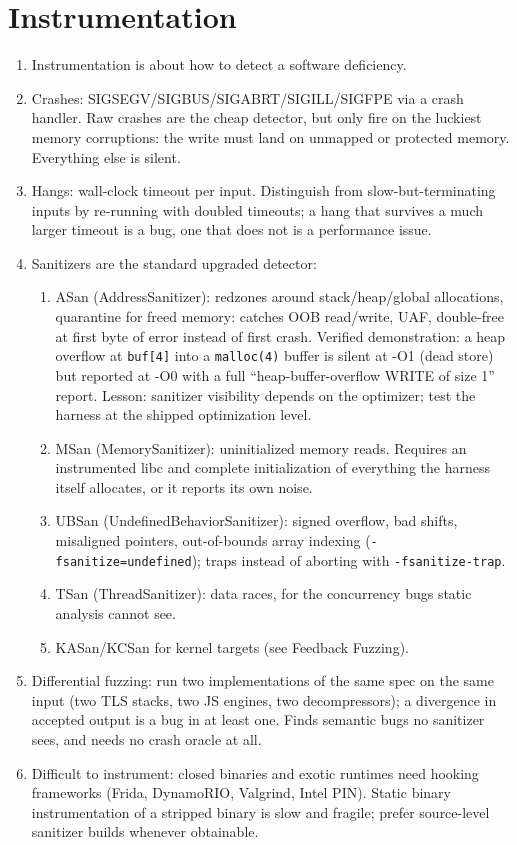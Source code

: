 \documentclass[12pt]{Training}
\begin{document}
\section*{Instrumentation}
\begin{enumerate}
	\item Instrumentation is about how to detect a software deficiency.
	\item Crashes: SIGSEGV/SIGBUS/SIGABRT/SIGILL/SIGFPE via a crash handler. Raw crashes are the cheap detector, but only fire on the luckiest memory corruptions: the write must land on unmapped or protected memory. Everything else is silent.
	\item Hangs: wall-clock timeout per input. Distinguish from slow-but-terminating inputs by re-running with doubled timeouts; a hang that survives a much larger timeout is a bug, one that does not is a performance issue.
	\item Sanitizers are the standard upgraded detector:
	\begin{enumerate}
	    \item ASan (AddressSanitizer): redzones around stack/heap/global allocations, quarantine for freed memory: catches OOB read/write, UAF, double-free at first byte of error instead of first crash. Verified demonstration: a heap overflow at \lstinline{buf[4]} into a \lstinline{malloc(4)} buffer is silent at -O1 (dead store) but reported at -O0 with a full ``heap-buffer-overflow WRITE of size 1'' report. Lesson: sanitizer visibility depends on the optimizer; test the harness at the shipped optimization level.
	    \item MSan (MemorySanitizer): uninitialized memory reads. Requires an instrumented libc and complete initialization of everything the harness itself allocates, or it reports its own noise.
	    \item UBSan (UndefinedBehaviorSanitizer): signed overflow, bad shifts, misaligned pointers, out-of-bounds array indexing (\lstinline{-fsanitize=undefined}); traps instead of aborting with \lstinline{-fsanitize-trap}.
	    \item TSan (ThreadSanitizer): data races, for the concurrency bugs static analysis cannot see.
	    \item KASan/KCSan for kernel targets (see Feedback Fuzzing).
	\end{enumerate}
	\item Differential fuzzing: run two implementations of the same spec on the same input (two TLS stacks, two JS engines, two decompressors); a divergence in accepted output is a bug in at least one. Finds semantic bugs no sanitizer sees, and needs no crash oracle at all.
	\item Difficult to instrument: closed binaries and exotic runtimes need hooking frameworks (Frida, DynamoRIO, Valgrind, Intel PIN). Static binary instrumentation of a stripped binary is slow and fragile; prefer source-level sanitizer builds whenever obtainable.
\end{enumerate}
\end{document}
